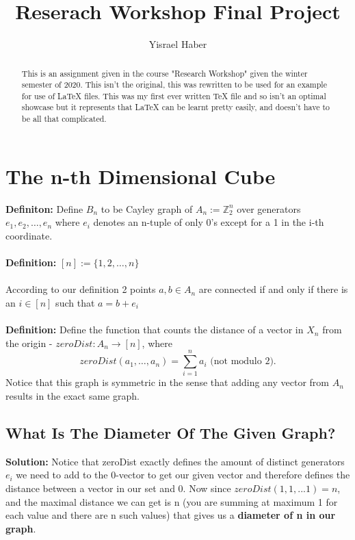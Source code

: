 \documentclass{article}
\title{Reserach Workshop Final Project}
\author{Yisrael Haber}
\begin{document}
\maketitle
\begin{abstract}
This is an assignment given in the course "Research Workshop" given the winter semester of 2020. This isn't the original, this was rewritten to be used for an example for use of LaTeX files. This was my first ever written TeX file and so isn't an optimal showcase but it represents that LaTeX can be learnt pretty easily, and doesn't have to be all that complicated. 
\end{abstract}
\tableofcontents
\newpage
\section{The n-th Dimensional Cube}
\textbf{Definiton:}
Define $B_n$ to be Cayley graph of $A_n:=\mathbb{Z}_2^n$ over generators
$e_1,e_2,\dots,e_n$  where $e_i$ denotes an n-tuple of only 0's except for a 1 in the i-th coordinate.
\\\\
\textbf{Definition:} $[n]:=\{1,2,\dots,n\}$
\\\\
According to our definition 2 points $a,b\in A_n$ are connected if and only if there is an $i\in[n]$ such that $a=b+e_i$
\\
\\
\textbf{Definition:} Define the function that counts the distance of a vector in $X_n$ from the origin -  $zeroDist:A_n \rightarrow[n]$, 
where \[zeroDist(a_1,\dots,a_n) = \sum_{i=1}^n a_i \text{ (not modulo 2).}\] Notice that this graph is symmetric in the sense that adding any vector from $A_n$ results in the exact same graph.
\subsection{What Is The Diameter Of The Given Graph?}
\textbf{Solution:}
Notice that zeroDist exactly defines the amount of distinct generators $e_i$ we need to add to the 0-vector to get our given vector and therefore defines the distance between a vector in our set and 0. Now since $zeroDist(1,1,...1)=n$, and the maximal distance we can get is n (you are summing at maximum 1 for each value and there are n such values) that gives us a \textbf{diameter of n in our graph}.
\end{document}
